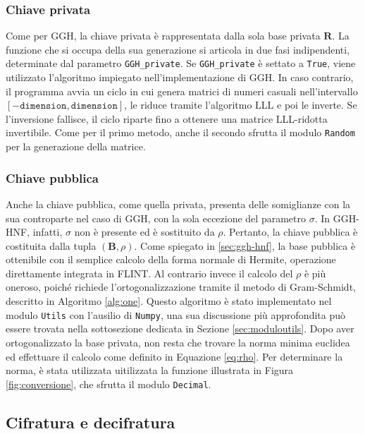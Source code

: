\subsubsection{Chiave privata}

Come per GGH, la chiave privata è rappresentata dalla sola base privata $\mathbf{R}$.
La funzione che si occupa della sua generazione si articola in due fasi indipendenti, 
determinate dal parametro \texttt{GGH\_private}. Se \texttt{GGH\_private}
è settato a \texttt{True}, viene utilizzato l'algoritmo impiegato nell'implementazione di GGH.
In caso contrario, il programma avvia un ciclo in cui genera matrici di numeri casuali 
nell'intervallo $[-\texttt{dimension},\texttt{dimension}]$, le riduce tramite l'algoritmo 
LLL e poi le inverte. Se l'inversione fallisce, il ciclo riparte fino a ottenere una 
matrice LLL-ridotta invertibile. 
Come per il primo metodo, anche il secondo sfrutta il modulo \texttt{Random} per la 
generazione della matrice.

\subsubsection{Chiave pubblica}

Anche la chiave pubblica, come quella privata, presenta delle somiglianze con la sua 
controparte nel caso di GGH, con la sola eccezione del parametro $\sigma$. 
In GGH-HNF, infatti, $\sigma$ non è presente ed è sostituito da $\rho$. 
Pertanto, la chiave pubblica è costituita dalla tupla $(\mathbf{B}, \rho)$. Come spiegato
in \ref{sec:ggh-hnf}, la base pubblica è ottenibile con il semplice calcolo della forma
normale di Hermite, operazione direttamente integrata in FLINT. Al contrario invece il 
calcolo del $\rho$ è più oneroso, poiché richiede l'ortogonalizzazione tramite il 
metodo di Gram-Schmidt, descritto in Algoritmo \ref{alg:one}. Questo algoritmo è stato 
implementato nel modulo \texttt{Utils} con l'ausilio di \texttt{Numpy}, una sua discussione più 
approfondita può essere trovata nella sottosezione dedicata in Sezione \ref{sec:moduloutils}. 
Dopo aver ortogonalizzato la base privata, non resta che trovare la norma minima euclidea 
ed effettuare il calcolo come definito in Equazione \ref{eq:rho}. 
Per determinare la norma, è stata utilizzata uitilizzata la funzione illustrata in Figura 
\ref{fig:conversione}, che sfrutta il modulo \texttt{Decimal}.

\subsection{Cifratura e decifratura}


